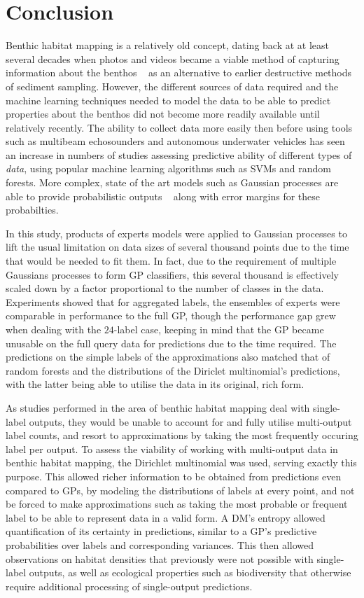\chapter{Conclusion} \label{chap:conclusion}

Benthic habitat mapping is a relatively old concept, dating back at at least several decades when photos and videos became a viable method of capturing information about the benthos ~\citep{gibson07} as an alternative to earlier destructive methods of sediment sampling. However, the different sources of data required and the machine learning techniques needed to model the data to be able to predict properties about the benthos did not become more readily available until relatively recently. The ability to collect data more easily then before using tools such as multibeam echosounders and autonomous underwater vehicles has seen an increase in numbers of studies assessing predictive ability of different types of \textit{data}, using popular machine learning algorithms such as SVMs and random forests. More complex, state of the art models such as Gaussian processes are able to provide probabilistic outputs ~\citep{bender12} along with error margins for these probabilties.

In this study, products of experts models were applied to Gaussian processes to lift the usual limitation on data sizes of several thousand points due to the time that would be needed to fit them. In fact, due to the requirement of multiple Gaussians processes to form GP classifiers, this several thousand is effectively scaled down by a factor proportional to the number of classes in the data. Experiments showed that for aggregated labels, the ensembles of experts were comparable in performance to the full GP, though the performance gap grew when dealing with the $24$-label case, keeping in mind that the GP became unusable on the full query data for predictions due to the time required. The predictions on the simple labels of the approximations also matched that of random forests and the distributions of the Diriclet multinomial's predictions, with the latter being able to utilise the data in its original, rich form.

As studies performed in the area of benthic habitat mapping deal with single-label outputs, they would be unable to account for and fully utilise multi-output label counts, and resort to approximations by taking the most frequently occuring label per output. To assess the viability of working with multi-output data in benthic habitat mapping, the Dirichlet multinomial was used, serving exactly this purpose. This allowed richer information to be obtained from predictions even compared to GPs, by modeling the distributions of labels at every point, and not be forced to make approximations such as taking the most probable or frequent label to be able to represent data in a valid form. A DM's entropy allowed quantification of its certainty in predictions, similar to a GP's predictive probabilities over labels and corresponding variances. This then allowed observations on habitat densities that previously were not possible with single-label outputs, as well as ecological properties such as biodiversity that otherwise require additional processing of single-output predictions.

